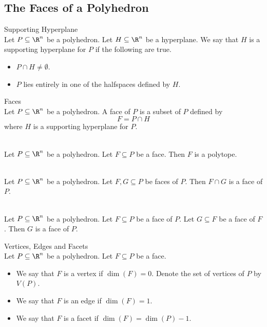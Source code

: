 \documentclass[a4paper]{article}
\begin{document}
\subsection{The Faces of a Polyhedron}
\begin{defn}{Supporting Hyperplane}{}\\
Let $P\subseteq\R^n$ be a polyhedron. Let $H\subseteq\R^n$ be a hyperplane. We say that $H$ is a supporting hyperplane for $P$ if the following are true. 
\begin{itemize}
\item $P\cap H\neq\emptyset$. 
\item $P$ lies entirely in one of the halfspaces defined by $H$. 
\end{itemize}
\end{defn}

\begin{defn}{Faces}{}\\
Let $P\subseteq\R^n$ be a polyhedron. A face of $P$ is a subset of $P$ defined by $$F=P\cap H$$ where $H$ is a supporting hyperplane for $P$. 
\end{defn}

\begin{lmm}{}{}\\
Let $P\subseteq\R^n$ be a polyhedron. Let $F\subseteq P$ be a face. Then $F$ is a polytope. 
\end{lmm}

\begin{lmm}{}{}\\
Let $P\subseteq\R^n$ be a polyhedron. Let $F,G\subseteq P$ be faces of $P$. Then $F\cap G$ is a face of $P$. 
\end{lmm}

\begin{lmm}{}{}\\
Let $P\subseteq\R^n$ be a polyhedron. Let $F\subseteq P$ be a face of $P$. Let $G\subseteq F$ be a face of $F$. Then $G$ is a face of $P$. 
\end{lmm}

\begin{defn}{Vertices, Edges and Facets}{}\\
Let $P\subseteq\R^n$ be a polyhedron. Let $F\subseteq P$ be a face. 
\begin{itemize}
\item We say that $F$ is a vertex if $\dim(F)=0$. Denote the set of vertices of $P$ by $V(P)$. 
\item We say that $F$ is an edge if $\dim(F)=1$. 
\item We say that $F$ is a facet if $\dim(F)=\dim(P)-1$. 
\end{itemize}
\end{defn}
\end{document}
